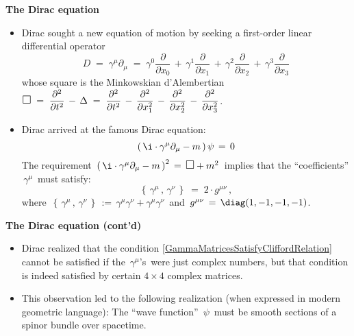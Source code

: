 
\begin{frame}{\headingColor\bf\LARGE The Dirac equation}

\scriptsize
\vskip 0.25cm

\begin{itemize}
\item
	Dirac sought a new equation of motion by seeking a first-order linear differential operator
	\begin{equation*}
	D
	\;=\;
		\gamma^{\mu}\partial_{\mu}
	\;=\;
		\gamma^{0}\dfrac{\partial}{\partial x_{0}} 
		\,+\, \gamma^{1}\dfrac{\partial}{\partial x_{1}} 
		\,+\, \gamma^{2}\dfrac{\partial}{\partial x_{2}} 
		\,+\, \gamma^{3}\dfrac{\partial}{\partial x_{3}} 
	\end{equation*}
	whose square is the Minkowskian d'Alembertian
	\;$\textnormal{\large$\Box$}
	\;=\;
		\dfrac{\partial^{2}}{\partial t^{2}} \,-\, \Delta
	\;=\;
		\dfrac{\partial^{2}}{\partial t^{2}}
		\,-\, \dfrac{\partial^{2}}{\partial x_{1}^{2}}
		\,-\, \dfrac{\partial^{2}}{\partial x_{2}^{2}}
		\,-\, \dfrac{\partial^{2}}{\partial x_{3}^{2}}
	$.\,
\item
	Dirac arrived at the famous Dirac equation:
	\begin{equation*}
	\left(\,\i\cdot\gamma^{\mu}\partial_{\mu} - m\,\right)\psi \, = \, 0
	\end{equation*}
	The requirement
	\,$\left(\,\i\cdot\gamma^{\mu}\partial_{\mu} - m\,\right)^{2} \,=\, \textnormal{\large$\Box$} + m^{2}$\,
	implies that the ``coefficients'' \,$\gamma^{\mu}$\, must satisfy:
	\begin{equation}
	\label{GammaMatricesSatisfyCliffordRelation}
	\left\{\,\gamma^{\mu}\,,\,\gamma^{\nu}\,\right\}
	\;=\;
		2\cdot g^{\mu\nu}\,,
	\end{equation}
	where
	\,$\left\{\,\gamma^{\mu}\,,\,\gamma^{\nu}\,\right\} \,:=\, \gamma^{\mu}\gamma^{\nu} + \gamma^{\mu}\gamma^{\nu}$\,
	and
	\,$g^{\mu\nu} \,=\, \diag(1,-1,-1,-1)$.
\end{itemize}

\end{frame}
\normalsize

\begin{frame}{\headingColor\bf\LARGE The Dirac equation (cont'd)}

\scriptsize
\vskip 0.25cm

\begin{itemize}
\item
	Dirac realized that the condition \eqref{GammaMatricesSatisfyCliffordRelation} cannot be satisfied
	if the \,$\gamma^{\mu}$'s\, were just complex numbers, but that condition is indeed satisfied by
	certain $4 \times 4$ complex matrices.
\item
	This observation led to the following realization (when expressed in modern geometric language):
	The ``wave function'' \,$\psi$\, must be smooth sections of a spinor bundle over spacetime.
\end{itemize}

\end{frame}
\normalsize

